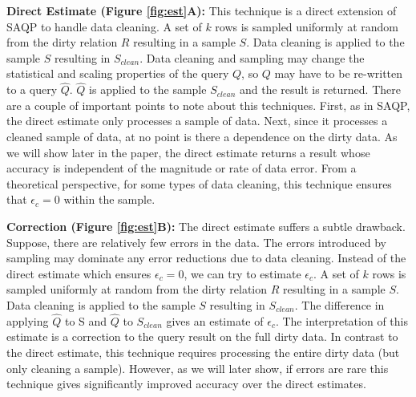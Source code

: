 \vspace{0.5em}
\noindent\textbf{Direct Estimate (Figure \ref{fig:est}A): } This technique is a direct extension of SAQP to handle data cleaning. A set of $k$ rows is sampled uniformly at random from the dirty relation $R$ resulting in a sample $S$. Data cleaning is applied to the sample $S$ resulting in $S_{clean}$.
Data cleaning and sampling may change the statistical and scaling properties of the query $Q$, so $Q$ may have to be re-written to a query $\widehat{Q}$. $\widehat{Q}$ is applied to the sample $S_{clean}$ and the result is returned. 
There are a couple of important points to note about this techniques.
First, as in SAQP, the direct estimate only processes a sample of data.
Next, since it processes a cleaned sample of data, at no point is there a dependence on the dirty data.
As we will show later in the paper, the direct estimate returns a result whose accuracy is independent of the magnitude or rate of data error. 
From a theoretical perspective, for some types of data cleaning, this technique ensures that $\epsilon_c = 0$ within the sample.

\vspace{0.5em}
\noindent\textbf{Correction (Figure \ref{fig:est}B): } The direct estimate suffers a subtle drawback. Suppose, there are relatively few errors in the data. The errors introduced by sampling may dominate any error reductions due to data cleaning. Instead of the direct estimate which ensures $\epsilon_c = 0$, we can try to estimate $\epsilon_c$. A set of $k$ rows is sampled uniformly at random from the dirty relation $R$ resulting in a sample $S$. Data cleaning is applied to the sample $S$ resulting in $S_{clean}$. 
The difference in applying $\widehat{Q}$ to S and $\widehat{Q}$ to $S_{clean}$ gives an estimate of $\epsilon_c$. 
The interpretation of this estimate is a correction to the query result on the full dirty data.
In contrast to the direct estimate, this technique requires processing the entire dirty data (but only cleaning a sample).
However, as we will later show, if errors are rare this technique gives significantly improved accuracy over the direct estimates.

